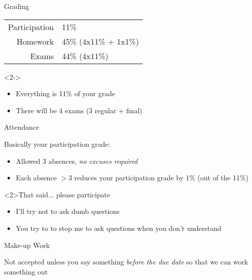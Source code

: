 \documentclass{beamer}
\begin{document}
    \begin{frame}{Grading}
      \begin{block}{}
        \begin{tabular}{r l}
          Participation & 11\%\\
          Homework      & 45\% (4x11\% + 1x1\%)\\
          Exams         & 44\% (4x11\%)
        \end{tabular}
      \end{block}

      \begin{alertblock}<2->{}
        \begin{itemize}
          \item Everything is 11\% of your grade
          \item There will be 4 exams (3 regular + final)
        \end{itemize}
      \end{alertblock}
    \end{frame}

    \begin{frame}{Attendance}
      \begin{block}{}
        Basically your participation grade:
        \begin{itemize}
          \item Allowed 3 absences, \emph{no excuses required}
          \item Each absence $>$3 reduces your participation grade by 1\% (out of the 11\%)
        \end{itemize}
      \end{block}
      \begin{alertblock}<2>{That said... please participate}
        \begin{itemize}
          \item I'll try not to ask dumb questions
          \item You try to to stop me to ask questions when you don't understand
        \end{itemize}
      \end{alertblock}
    \end{frame}

    \begin{frame}{Make-up Work}
      \begin{block}{}
        Not accepted unless you say something \emph{before the due date} so that we can work something out
      \end{block}
    \end{frame}
\end{document}

